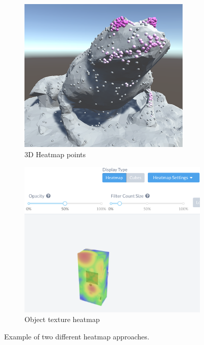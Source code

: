 \begin{figure}[!ht]\centering
    \begin{subfigure}[b]{0.4\textwidth}
        \centering
        \includegraphics[width=0.9\textwidth]{img/ugwitz-heatmap.png}
        \caption{3D Heatmap points~\cite[p. 52]{ugwitz2020thesis}}
        \label{fig:ugwitz-heatmap}
    \end{subfigure}
    \hfill
    \begin{subfigure}[b]{0.55\textwidth}
        \centering
        \includegraphics[width=\textwidth]{img/cognitive3d-heatmap.png}
        \caption{Object texture heatmap~\cite{cognitive3d-dynamic-objects}}
        \label{fig:cognitive-heatmap}
    \end{subfigure}
    \caption{Example of two different heatmap approaches.}
\end{figure}

